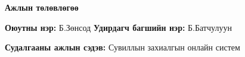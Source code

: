 
\newpage
{}
{}

{\noindent\large\bfseries Ажлын төлөвлөгөө\par}
\vspace{0.45cm}

\begingroup
{}
\setlength{\parskip}{3pt}

\noindent
\textbf{Оюутны нэр:} Б.Зөнсод
\hfill
\textbf{Удирдагч багшийн нэр:} Б.Батчулуун

\smallskip
\noindent
\textbf{Судалгааны ажлын сэдэв:} Сувиллын захиалгын онлайн систем

\vspace{0.35cm}

